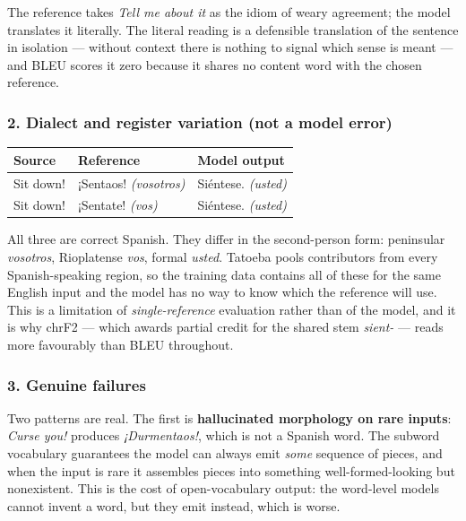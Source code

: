\documentclass[11pt,a4paper]{article}
\begin{document}
The reference takes \emph{Tell me about it} as the idiom of weary agreement; the
model translates it literally. The literal reading is a defensible translation
of the sentence in isolation --- without context there is nothing to signal
which sense is meant --- and BLEU scores it zero because it shares no content
word with the chosen reference.

\subsubsection*{2. Dialect and register variation (not a model error)}

\begin{center}
\small
\begin{tabular}{@{}lll@{}}
\toprule
Source & Reference & Model output \\
\midrule
Sit down! & ¡Sentaos! \emph{(vosotros)} & Siéntese. \emph{(usted)} \\
Sit down! & ¡Sentate! \emph{(vos)} & Siéntese. \emph{(usted)} \\
\bottomrule
\end{tabular}
\end{center}

All three are correct Spanish. They differ in the second-person form: peninsular
\emph{vosotros}, Rioplatense \emph{vos}, formal \emph{usted}. Tatoeba pools
contributors from every Spanish-speaking region, so the training data contains
all of these for the same English input and the model has no way to know which
the reference will use. This is a limitation of \emph{single-reference}
evaluation rather than of the model, and it is why chrF2 --- which awards
partial credit for the shared stem \emph{sient-} --- reads more favourably than
BLEU throughout.

\subsubsection*{3. Genuine failures}

Two patterns are real. The first is \textbf{hallucinated morphology on rare
inputs}: \emph{Curse you!} produces \emph{¡Durmentaos!}, which is not a Spanish
word. The subword vocabulary guarantees the model can always emit \emph{some}
sequence of pieces, and when the input is rare it assembles pieces into
something well-formed-looking but nonexistent. This is the cost of open-vocabulary
output: the word-level models cannot invent a word, but they emit 
instead, which is worse.
\end{document}
